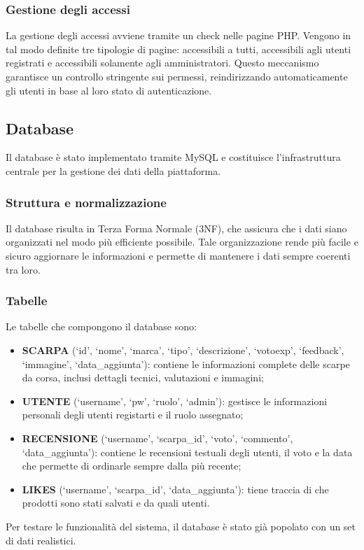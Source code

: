 \documentclass[a4paper, 12pt]{article}
\begin{document}
\begin{justify}
\subsubsection{Gestione degli accessi}

La gestione degli accessi avviene tramite un check nelle pagine PHP. Vengono in tal modo definite tre tipologie di pagine: accessibili a tutti, accessibili agli utenti registrati e accessibili solamente agli amministratori. Questo meccanismo garantisce un controllo stringente sui permessi, reindirizzando automaticamente gli utenti in base al loro stato di autenticazione.

\subsection{Database}

Il database è stato implementato tramite MySQL e costituisce l'infrastruttura centrale per la gestione dei dati della piattaforma.

\subsubsection{Struttura e normalizzazione}

Il database risulta in Terza Forma Normale (3NF), che assicura che i dati siano organizzati nel modo più efficiente possibile. Tale organizzazione rende più facile e sicuro aggiornare le informazioni e permette di mantenere i dati sempre coerenti tra loro.

\subsubsection{Tabelle}

Le tabelle che compongono il database sono:
\begin{itemize}
    \item \textbf{SCARPA} (`id', `nome', `marca', `tipo', `descrizione', `votoexp', `feedback', `immagine', `data\_aggiunta'): contiene le informazioni complete delle scarpe da corsa, inclusi dettagli tecnici, valutazioni e immagini;
    \item \textbf{UTENTE} (`username', `pw', `ruolo', `admin'): gestisce le informazioni personali degli utenti registarti e il ruolo assegnato;
    \item \textbf{RECENSIONE} (`username', `scarpa\_id', `voto', `commento', `data\_aggiunta'): contiene le recensioni testuali degli utenti, il voto e la data che permette di ordinarle sempre dalla più recente;
    \item \textbf{LIKES} (`username', `scarpa\_id', `data\_aggiunta'): tiene traccia di che prodotti sono stati salvati e da quali utenti.
\end{itemize}
Per testare le funzionalità del sistema, il database è stato già popolato con un set di dati realistici.



\end{justify}
\end{document}
